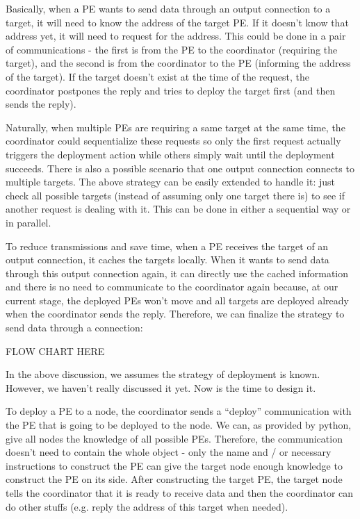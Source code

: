 \documentclass[msc,cs,logo]{infthesis}
\begin{document}
	Basically, when a PE wants to send data through an output connection to a target, it will need to know the address of the target PE. If it doesn't know that address yet, it will need to request for the address. This could be done in a pair of communications - the first is from the PE to the coordinator (requiring the target), and the second is from the coordinator to the PE (informing the address of the target). If the target doesn't exist at the time of the request, the coordinator postpones the reply and tries to deploy the target first (and then sends the reply).
	
	Naturally, when multiple PEs are requiring a same target at the same time, the coordinator could sequentialize these requests so only the first request actually triggers the deployment action while others simply wait until the deployment succeeds. There is also a possible scenario that one output connection connects to multiple targets. The above strategy can be easily extended to handle it: just check all possible targets (instead of assuming only one target there is) to see if another request is dealing with it. This can be done in either a sequential way or in parallel.
	
	To reduce transmissions and save time, when a PE receives the target of an output connection, it caches the targets locally. When it wants to send data through this output connection again, it can directly use the cached information and there is no need to communicate to the coordinator again because, at our current stage, the deployed PEs won't move and all targets are deployed already when the coordinator sends the reply. Therefore, we can finalize the strategy to send data through a connection:
	
	FLOW CHART HERE
	
	In the above discussion, we assumes the strategy of deployment is known. However, we haven't really discussed it yet. Now is the time to design it.
	
	To deploy a PE to a node, the coordinator sends a ``deploy'' communication with the PE that is going to be deployed to the node. We can, as provided by python, give all nodes the knowledge of all possible PEs. Therefore, the communication doesn't need to contain the whole object - only the name and / or necessary instructions to construct the PE can give the target node enough knowledge to construct the PE on its side. After constructing the target PE, the target node tells the coordinator that it is ready to receive data and then the coordinator can do other stuffs (e.g. reply the address of this target when needed).
	
\end{document}
